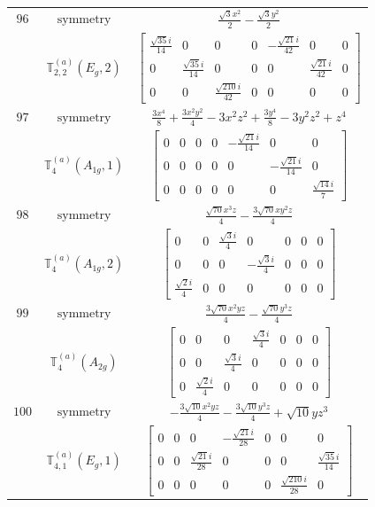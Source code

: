 \documentclass[fleqn,8pt,landscape]{jsarticle}
\begin{document}
\begin{longtable}{ccc}
$ 96 $ & $ \text{symmetry} $ & $ \frac{\sqrt{3} x^{2}}{2} - \frac{\sqrt{3} y^{2}}{2} $ \\
$  $ & $ \mathbb{T}_{2,2}^{(a)}(E_{g},2) $ & $ \begin{bmatrix} \frac{\sqrt{35} i}{14} & 0 & 0 & 0 & - \frac{\sqrt{21} i}{42} & 0 & 0 \\ 0 & \frac{\sqrt{35} i}{14} & 0 & 0 & 0 & \frac{\sqrt{21} i}{42} & 0 \\ 0 & 0 & \frac{\sqrt{210} i}{42} & 0 & 0 & 0 & 0 \end{bmatrix} $ \\ \hline
$ 97 $ & $ \text{symmetry} $ & $ \frac{3 x^{4}}{8} + \frac{3 x^{2} y^{2}}{4} - 3 x^{2} z^{2} + \frac{3 y^{4}}{8} - 3 y^{2} z^{2} + z^{4} $ \\
$  $ & $ \mathbb{T}_{4}^{(a)}(A_{1g},1) $ & $ \begin{bmatrix} 0 & 0 & 0 & 0 & - \frac{\sqrt{21} i}{14} & 0 & 0 \\ 0 & 0 & 0 & 0 & 0 & - \frac{\sqrt{21} i}{14} & 0 \\ 0 & 0 & 0 & 0 & 0 & 0 & \frac{\sqrt{14} i}{7} \end{bmatrix} $ \\ \hline
$ 98 $ & $ \text{symmetry} $ & $ \frac{\sqrt{70} x^{3} z}{4} - \frac{3 \sqrt{70} x y^{2} z}{4} $ \\
$  $ & $ \mathbb{T}_{4}^{(a)}(A_{1g},2) $ & $ \begin{bmatrix} 0 & 0 & \frac{\sqrt{3} i}{4} & 0 & 0 & 0 & 0 \\ 0 & 0 & 0 & - \frac{\sqrt{3} i}{4} & 0 & 0 & 0 \\ \frac{\sqrt{2} i}{4} & 0 & 0 & 0 & 0 & 0 & 0 \end{bmatrix} $ \\ \hline
$ 99 $ & $ \text{symmetry} $ & $ \frac{3 \sqrt{70} x^{2} y z}{4} - \frac{\sqrt{70} y^{3} z}{4} $ \\
$  $ & $ \mathbb{T}_{4}^{(a)}(A_{2g}) $ & $ \begin{bmatrix} 0 & 0 & 0 & \frac{\sqrt{3} i}{4} & 0 & 0 & 0 \\ 0 & 0 & \frac{\sqrt{3} i}{4} & 0 & 0 & 0 & 0 \\ 0 & \frac{\sqrt{2} i}{4} & 0 & 0 & 0 & 0 & 0 \end{bmatrix} $ \\ \hline
$ 100 $ & $ \text{symmetry} $ & $ - \frac{3 \sqrt{10} x^{2} y z}{4} - \frac{3 \sqrt{10} y^{3} z}{4} + \sqrt{10} y z^{3} $ \\
$  $ & $ \mathbb{T}_{4,1}^{(a)}(E_{g},1) $ & $ \begin{bmatrix} 0 & 0 & 0 & - \frac{\sqrt{21} i}{28} & 0 & 0 & 0 \\ 0 & 0 & \frac{\sqrt{21} i}{28} & 0 & 0 & 0 & \frac{\sqrt{35} i}{14} \\ 0 & 0 & 0 & 0 & 0 & \frac{\sqrt{210} i}{28} & 0 \end{bmatrix} $ \\ \hline

\end{longtable}
\end{document}
